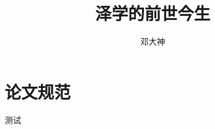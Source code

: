 \documentclass[bachelor]{ustcthesis}
\title{泽学的前世今生}
\author{邓大神}
\begin{document}
\maketitle

%
%
%

\frontmatter

\tableofcontents
\listoffigures
\listoftables
\listofalgorithms{}  %


\mainmatter{}

%
%


%
%
%


\appendix
\chapter{论文规范}

测试\cite{knuth86a}
\backmatter{}


\end{document}
